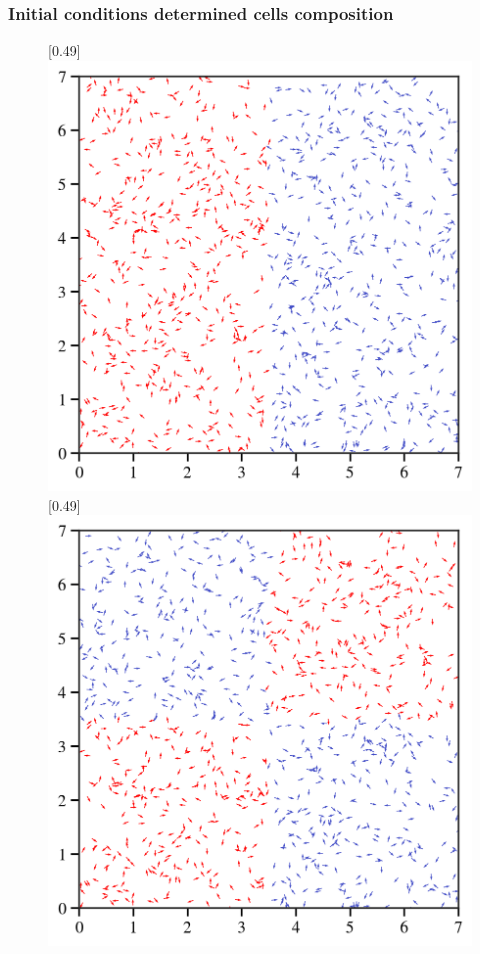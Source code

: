 \documentclass{article}
\begin{document}
\newpage
\subsubsection{Initial conditions determined cells composition \label{sec:cellComposition}}

\begin{figure}[H]
    \centering
    [0.49\linewidth]{
      \includegraphics[width=\linewidth]{figs/halfSide.png}
    }
    \hfill
    [0.49\linewidth]{
      \includegraphics[width=\linewidth]{figs/chess.png}
}
\end{figure}
\end{document}
